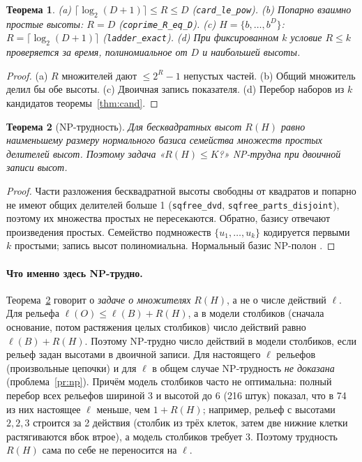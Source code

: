 \documentclass[11pt,a4paper]{article}
\theoremstyle{plain}
\newtheorem{theorem}{Теорема}[section]
\theoremstyle{definition}
\theoremstyle{remark}
\newcommand{\lean}[1]{\texttt{#1}}
\begin{document}
\begin{theorem}\label{thm:R}
(a) $\lceil\log_2(D+1)\rceil\le R\le D$ (\lean{card\_le\_pow}). (b) Попарно взаимно простые высоты: $R=D$ (\lean{coprime\_R\_eq\_D}). (c) $H=\{b,\dots,b^D\}$: $R=\lceil\log_2(D+1)\rceil$ (\lean{ladder\_exact}). (d) При фиксированном $k$ условие $R\le k$ проверяется за время, полиномиальное от $D$ и наибольшей высоты.
\end{theorem}
\begin{proof}
(a) $R$ множителей дают $\le2^R-1$ непустых частей. (b) Общий множитель делил бы обе высоты. (c) Двоичная запись показателя. (d) Перебор наборов из $k$ кандидатов теоремы~\ref{thm:cand}.
\end{proof}

\begin{theorem}[NP-трудность]\label{thm:np}
Для бесквадратных высот $R(H)$ равно наименьшему размеру нормального базиса семейства множеств простых делителей высот. Поэтому задача «$R(H)\le K$?» NP-трудна при двоичной записи высот.
\end{theorem}
\begin{proof}
Части разложения бесквадратной высоты свободны от квадратов и попарно не имеют общих делителей больше 1 (\lean{sqfree\_dvd}, \lean{sqfree\_parts\_disjoint}), поэтому их множества простых не пересекаются. Обратно, базису отвечают произведения простых. Семейство подмножеств $\{u_1,\dots,u_k\}$ кодируется первыми $k$ простыми; запись высот полиномиальна. Нормальный базис NP-полон \cite{jiang}.
\end{proof}

\paragraph{Что именно здесь NP-трудно.} Теорема~\ref{thm:np} говорит о \emph{задаче о множителях} $R(H)$, а не о числе действий $\ell$. Для рельефа $\ell(O)\le\ell(B)+R(H)$, а в модели столбиков (сначала основание, потом растяжения целых столбиков) число действий равно $\ell(B)+R(H)$. Поэтому NP-трудно число действий в модели столбиков, если рельеф задан высотами в двоичной записи. Для настоящего $\ell$ рельефов (произвольные цепочки) и для $\ell$ в общем случае NP-трудность \emph{не доказана} (проблема~\ref{pr:np}). Причём модель столбиков часто не оптимальна: полный перебор всех рельефов шириной 3 и высотой до 6 (216 штук) показал, что в 74 из них настоящее $\ell$ меньше, чем $1+R(H)$; например, рельеф с высотами $2,2,3$ строится за 2 действия (столбик из трёх клеток, затем две нижние клетки растягиваются вбок втрое), а модель столбиков требует 3. Поэтому трудность $R(H)$ сама по себе не переносится на $\ell$.
\end{document}
